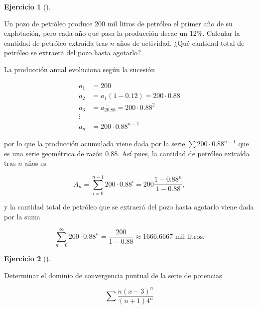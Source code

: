 \documentclass[
  spanish,
  a4paper,
]{scrreport}
\theoremstyle{definition}
\newtheorem{exercise}{Ejercicio}[chapter]
\theoremstyle{remark}
\begin{document}
\begin{exercise}[]\protect\hypertarget{exr-2}{}\label{exr-2}

Un pozo de petróleo produce 200 mil litros de petróleo el primer año de
su explotación, pero cada año que pasa la producción decae un 12\%.
Calcular la cantidad de petróleo extraída tras \(n\) años de actividad.
¿Qué cantidad total de petróleo se extraerá del pozo hasta agotarlo?

\end{exercise}

\begin{tcolorbox}[enhanced jigsaw, arc=.35mm, bottomrule=.15mm, bottomtitle=1mm, breakable, colback=white, colbacktitle=quarto-callout-tip-color!10!white, colframe=quarto-callout-tip-color-frame, coltitle=black, left=2mm, leftrule=.75mm, opacityback=0, opacitybacktitle=0.6, rightrule=.15mm, title=\textcolor{quarto-callout-tip-color}{\faLightbulb}\hspace{0.5em}{Solución}, titlerule=0mm, toprule=.15mm, toptitle=1mm]

La producción anual evoluciona según la sucesión

\begin{align*}
a_1 &= 200\\
a_2 &= a_1(1-0.12) = 200\cdot 0.88\\
a_3 &= a_20.88 = 200\cdot 0.88^2\\
\vdots\\
a_n &= 200\cdot 0.88^{n-1}
\end{align*}

por lo que la producción acumulada viene dada por la serie
\(\sum 200\cdot 0.88^{n-1}\) que es una serie geométrica de razón
\(0.88\). Así pues, la cantidad de petróleo extraída tras \(n\) años es

\[
A_n = \sum_{i=0}^{n-1} 200\cdot 0.88^i = 200 \frac{1-0.88^n}{1-0.88},
\]

y la cantidad total de petróleo que se extraerá del pozo hasta agotarlo
viene dada por la suma

\[
\sum_{n=0}^\infty 200\cdot 0.88^n = \frac{200}{1-0.88} \approx 1666.6667 \mbox{ mil litros}.
\]

\end{tcolorbox}

\begin{exercise}[]\protect\hypertarget{exr-3}{}\label{exr-3}

Determinar el dominio de convergencia puntual de la serie de potencias

\[
\sum \frac{n(x-3)^n}{(n+1)4^n}
\]

\end{exercise}
\end{document}
